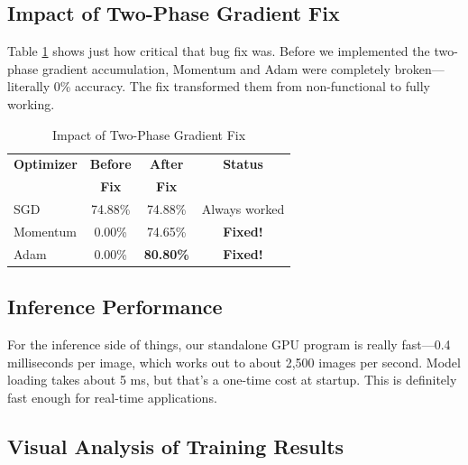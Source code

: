 \documentclass[conference]{IEEEtran}
\begin{document}
\subsection{Impact of Two-Phase Gradient Fix}

Table \ref{tab:bugfix} shows just how critical that bug fix was. Before we implemented the two-phase gradient accumulation, Momentum and Adam were completely broken—literally 0\% accuracy. The fix transformed them from non-functional to fully working.

\begin{table}[htbp]
\caption{Impact of Two-Phase Gradient Fix}
\begin{center}
\begin{tabular}{lccc}
\toprule
\textbf{Optimizer} & \textbf{Before} & \textbf{After} & \textbf{Status}\\
& \textbf{Fix} & \textbf{Fix} & \\
\midrule
SGD & 74.88\% & 74.88\% & Always worked \\
Momentum & 0.00\% & 74.65\% & \textbf{Fixed!} \\
Adam & 0.00\% & \textbf{80.80\%} & \textbf{Fixed!} \\
\bottomrule
\end{tabular}
\label{tab:bugfix}
\end{center}
\end{table}

\subsection{Inference Performance}

For the inference side of things, our standalone GPU program is really fast—0.4 milliseconds per image, which works out to about 2,500 images per second. Model loading takes about 5 ms, but that's a one-time cost at startup. This is definitely fast enough for real-time applications.

\subsection{Visual Analysis of Training Results}
\end{document}
